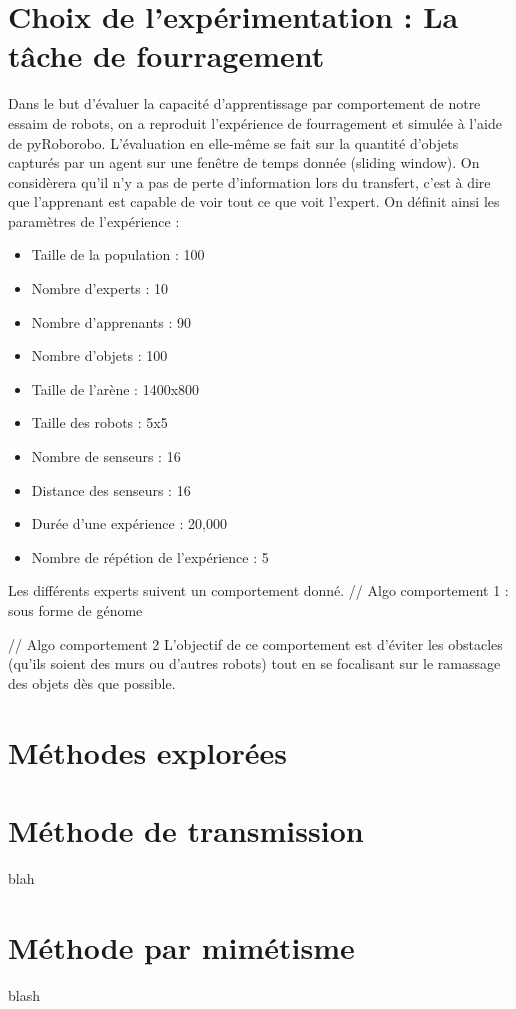 \documentclass[a4paper, 12pt]{report}
\begin{document}
    \section{Choix de l'expérimentation : La tâche de fourragement}
    Dans le but d'évaluer la capacité d'apprentissage par comportement de notre essaim de robots, on a reproduit l'expérience de fourragement et simulée à l'aide de pyRoborobo.
    L'évaluation en elle-même se fait sur la quantité d'objets capturés par un agent sur une fenêtre de temps donnée (sliding window). On considèrera qu'il n'y a pas de perte d'information lors du transfert, c'est à dire que l'apprenant est capable de voir tout ce que voit l'expert.
    On définit ainsi les paramètres de l'expérience :
    \begin{itemize}
    \item Taille de la population : 100
    \item Nombre d'experts : 10
    \item Nombre d'apprenants : 90
    \item Nombre d'objets : 100
    \item Taille de l'arène : 1400x800
    \item Taille des robots : 5x5
    \item Nombre de senseurs : 16
    \item Distance des senseurs : 16
    \item Durée d'une expérience : 20,000
    \item Nombre de répétion de l'expérience : 5
    \end{itemize}

Les différents experts suivent un comportement donné.
// Algo comportement 1 : sous forme de génome

// Algo comportement 2
L'objectif de ce comportement est d'éviter les obstacles (qu'ils soient des murs ou d'autres robots) tout en se focalisant sur le ramassage des objets dès que possible.

	\section{Méthodes explorées}
	
	\section{Méthode de transmission}
	blah
	\section{Méthode par mimétisme}
	blash
\end{document}
